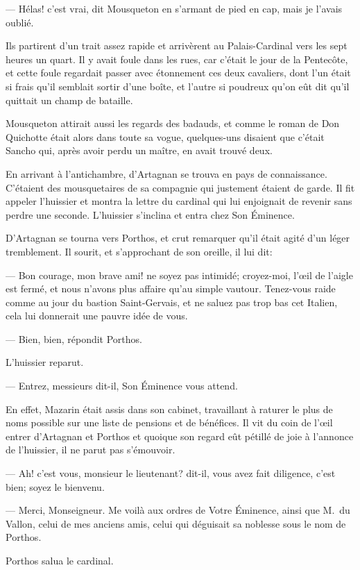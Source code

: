 — Hélas! c'est vrai, dit Mousqueton en s'armant de pied en cap, mais je l'avais oublié.

Ils partirent d'un trait assez rapide et arrivèrent au Palais-Cardinal vers les sept heures un quart. Il y avait foule dans les rues, car c'était le jour de la Pentecôte, et cette foule regardait passer avec étonnement ces deux cavaliers, dont l'un était si frais qu'il semblait sortir d'une boîte, et l'autre si poudreux qu'on eût dit qu'il quittait un champ de bataille.

Mousqueton attirait aussi les regards des badauds, et comme le roman de Don Quichotte était alors dans toute sa vogue, quelques-uns disaient que c'était Sancho qui, après avoir perdu un maître, en avait trouvé deux.

En arrivant à l'antichambre, d'Artagnan se trouva en pays de connaissance. C'étaient des mousquetaires de sa compagnie qui justement étaient de garde. Il fit appeler l'huissier et montra la lettre du cardinal qui lui enjoignait de revenir sans perdre une seconde. L'huissier s'inclina et entra chez Son Éminence.

D'Artagnan se tourna vers Porthos, et crut remarquer qu'il était agité d'un léger tremblement. Il sourit, et s'approchant de son oreille, il lui dit:

— Bon courage, mon brave ami! ne soyez pas intimidé; croyez-moi, l'œil de l'aigle est fermé, et nous n'avons plus affaire qu'au simple vautour. Tenez-vous raide comme au jour du bastion Saint-Gervais, et ne saluez pas trop bas cet Italien, cela lui donnerait une pauvre idée de vous.

— Bien, bien, répondit Porthos.

L'huissier reparut.

— Entrez, messieurs dit-il, Son Éminence vous attend.

En effet, Mazarin était assis dans son cabinet, travaillant à raturer le plus de noms possible sur une liste de pensions et de bénéfices. Il vit du coin de l'œil entrer d'Artagnan et Porthos et quoique son regard eût pétillé de joie à l'annonce de l'huissier, il ne parut pas s'émouvoir.

— Ah! c'est vous, monsieur le lieutenant? dit-il, vous avez fait diligence, c'est bien; soyez le bienvenu.

— Merci, Monseigneur. Me voilà aux ordres de Votre Éminence, ainsi que M.~du Vallon, celui de mes anciens amis, celui qui déguisait sa noblesse sous le nom de Porthos.

Porthos salua le cardinal.


